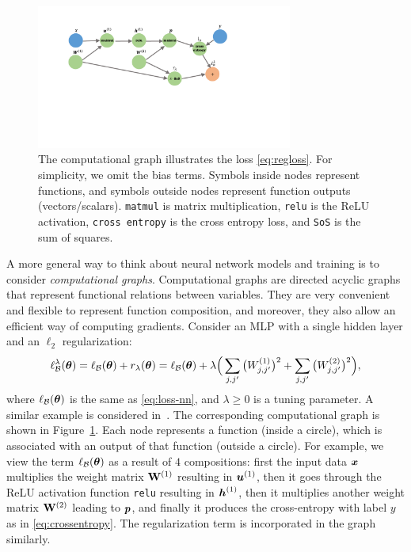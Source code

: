\begin{figure}[t]
\centering
\includegraphics[width=0.75\textwidth]{compuGraph2}\caption{The computational graph illustrates the loss \eqref{eq:regloss}. For simplicity, we omit the bias terms. Symbols inside nodes represent functions, and symbols outside nodes represent function outputs (vectors/scalars). {\normalfont \texttt{matmul}} is matrix multiplication, {\normalfont \texttt{relu}} is the ReLU activation, {\normalfont \texttt{cross entropy}} is the cross entropy loss, and {\normalfont \texttt{SoS}} is the sum of squares.} \label{fig:comgraph}
\end{figure}

A more general way to think about neural network models and training is to consider \textit{computational graphs}. Computational graphs are directed acyclic graphs that represent functional relations between variables. They are very convenient and flexible to represent function composition, and moreover, they also allow an efficient way of computing gradients. Consider an MLP with a single hidden layer and an $\ell_2$ regularization:
\begin{equation}\label{eq:regloss}
\ell_{\mathcal{B}}^\lambda (\text{\boldmath $\theta$}) = \ell_{\mathcal{B}}(\text{\boldmath $\theta$}) + r_\lambda(\text{\boldmath $\theta$}) = \ell_{\mathcal{B}}(\text{\boldmath $\theta$}) + \lambda \Big( \sum_{j,j'} \big(W_{j,j'}^{(1)}\big)^2 + \sum_{j,j'} \big(W_{j,j'}^{(2)}\big)^2 \Big),
\end{equation}
where $\ell_{\mathcal{B}}(\text{\boldmath $\theta$})$ is the same as \eqref{eq:loss-nn}, and $\lambda \ge 0$ is a tuning parameter. A similar example is considered in~\cite{deeplearningbook}. The corresponding computational graph is shown in Figure~\ref{fig:comgraph}. Each node represents a function (inside a circle), which is associated with an output of that function (outside a circle). For example, we view the term $\ell_{\mathcal{B}}(\text{\boldmath $\theta$})$ as a result of $4$ compositions: first the input data $\text{\boldmath $x$}$ multiplies the weight matrix $\mathrm{\bf W}^{(1)}$ resulting in $\text{\boldmath $u$}^{(1)}$, then it goes through the ReLU activation function \texttt{relu} resulting in $\text{\boldmath $h$}^{(1)}$, then it multiplies another weight matrix $\mathrm{\bf W}^{(2)}$ leading to $\text{\boldmath $p$}$, and finally it produces the cross-entropy with label $y$ as in \eqref{eq:crossentropy}. The regularization term is incorporated in the graph similarly.

